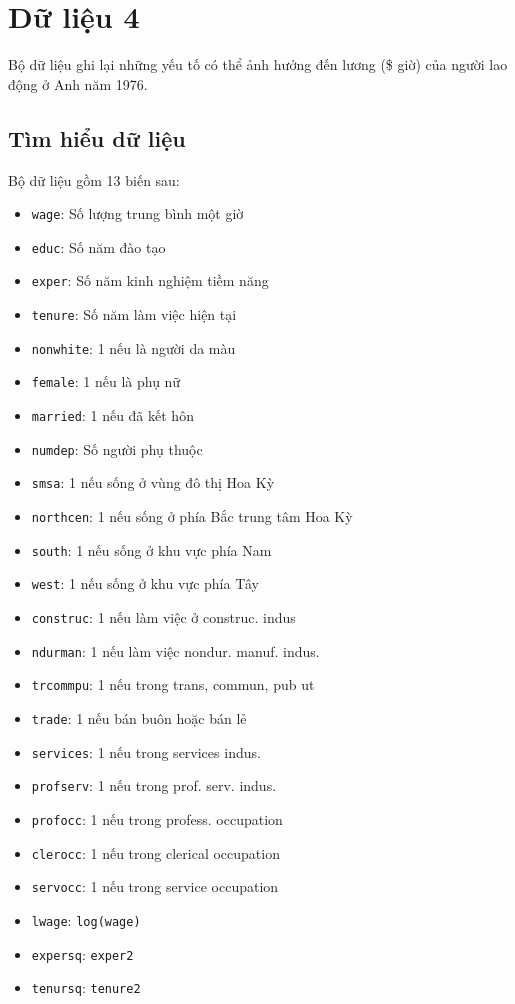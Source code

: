 
\section{Dữ liệu 4}
Bộ dữ liệu ghi lại những yếu tố có thể ảnh hưởng đến lương (\$ giờ) của người lao động ở Anh năm 1976.

\subsection*{Tìm hiểu dữ liệu}
Bộ dữ liệu gồm 13 biến sau:
\begin{itemize}
	\item \texttt{wage}: Số lượng trung bình một giờ
	\item \texttt{educ}: Số năm đào tạo
	\item \texttt{exper}: Số năm kinh nghiệm tiềm năng
	\item \texttt{tenure}: Số năm làm việc hiện tại
	\item \texttt{nonwhite}: 1 nếu là người da màu
	\item \texttt{female}: 1 nếu là phụ nữ
	\item \texttt{married}: 1 nếu đã kết hôn
	\item \texttt{numdep}: Số người phụ thuộc
	\item \texttt{smsa}: 1 nếu sống ở vùng đô thị Hoa Kỳ
	\item \texttt{northcen}: 1 nếu sống ở phía Bắc trung tâm Hoa Kỳ
	\item \texttt{south}: 1 nếu sống ở khu vực phía Nam
	\item \texttt{west}: 1 nếu sống ở khu vực phía Tây
	\item \texttt{construc}: 1 nếu làm việc ở construc. indus
	\item \texttt{ndurman}: 1 nếu làm việc nondur. manuf. indus.
	\item \texttt{trcommpu}: 1 nếu trong trans, commun, pub ut
	\item \texttt{trade}: 1 nếu bán buôn hoặc bán lẻ
	\item \texttt{services}: 1 nếu trong services indus.
	\item \texttt{profserv}: 1 nếu trong prof. serv. indus.
	\item \texttt{profocc}: 1 nếu trong profess. occupation
	\item \texttt{clerocc}: 1 nếu trong clerical occupation
	\item \texttt{servocc}: 1 nếu trong service occupation
	\item \texttt{lwage}: \texttt{log(wage)}
	\item \texttt{expersq}: \texttt{exper2}
	\item \texttt{tenursq}: \texttt{tenure2}
\end{itemize}


